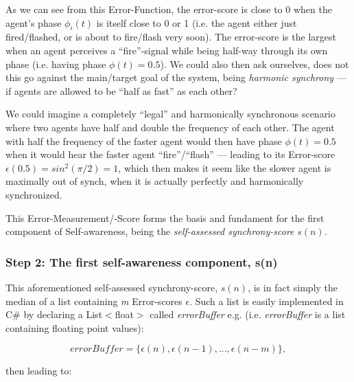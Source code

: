 	As we can see from this Error-Function, the error-score is close to 0 when the agent's phase $\phi_i(t)$ is itself close to 0 or 1 (i.e. the agent either just fired/flashed, or is about to fire/flash very soon). The error-score is the largest when an agent perceives a ``fire''-signal while being half-way through its own phase (i.e. having phase $\phi(t)=0.5$). We could also then ask ourselves, does not this go against the main/target goal of the system, being \textit{harmonic synchrony} — if agents are allowed to be ``half as fast'' as each other? 
	
	We could imagine a completely ``legal'' and harmonically synchronous scenario where two agents have half and double the frequency of each other. The agent with half the frequency of the faster agent would then have phase $\phi(t)=0.5$ when it would hear the faster agent ``fire''/``flash'' — leading to its Error-score $\epsilon(0.5) = sin^2(\pi/2) = 1$, which then makes it seem like the slower agent is maximally out of synch, when it is actually perfectly and harmonically synchronized.  
	
	This Error-Measurement/-Score forms the basis and fundament for the first component of Self-awareness, being the \textit{self-assessed synchrony-score} $s(n)$.
	
	\subsubsection{Step 2: The first self-awareness component, s(n)}
	This aforementioned self-assessed synchrony-score, $s(n)$, is in fact simply the median of a list  containing \textit{m} Error-scores $\epsilon$. Such a list is easily implemented in C\# by declaring a List$<$float$>$ called \textit{errorBuffer} e.g. (i.e. \textit{errorBuffer} is a list containing floating point values):
	
	\begin{equation}
	\label{error_buffer}
		errorBuffer = \{\epsilon(n), \epsilon(n-1), ... , \epsilon(n-m)\},
	\end{equation} \nl
	
	then leading to:
	
